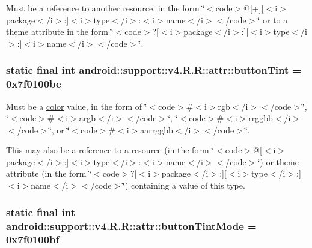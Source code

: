 Must be a reference to another resource, in the form \char`\"{}$<$code$>$@\mbox{[}+\mbox{]}\mbox{[}$<$i$>$package$<$/i$>$:\mbox{]}$<$i$>$type$<$/i$>$:$<$i$>$name$<$/i$>$$<$/code$>$\char`\"{} or to a theme attribute in the form \char`\"{}$<$code$>$?\mbox{[}$<$i$>$package$<$/i$>$:\mbox{]}\mbox{[}$<$i$>$type$<$/i$>$:\mbox{]}$<$i$>$name$<$/i$>$$<$/code$>$\char`\"{}. \hypertarget{classandroid_1_1support_1_1v4_1_1_r_1_1attr_52c5252b61da74bac638e9f63458fc16}{
\subsubsection[{buttonTint}]{\setlength{\rightskip}{0pt plus 5cm}static final int android::support::v4.R.R::attr::buttonTint = 0x7f0100be}}
\label{classandroid_1_1support_1_1v4_1_1_r_1_1attr_52c5252b61da74bac638e9f63458fc16}


Must be a \hyperlink{classandroid_1_1support_1_1v4_1_1_r_1_1color}{color} value, in the form of \char`\"{}$<$code$>$\#$<$i$>$rgb$<$/i$>$$<$/code$>$\char`\"{}, \char`\"{}$<$code$>$\#$<$i$>$argb$<$/i$>$$<$/code$>$\char`\"{}, \char`\"{}$<$code$>$\#$<$i$>$rrggbb$<$/i$>$$<$/code$>$\char`\"{}, or \char`\"{}$<$code$>$\#$<$i$>$aarrggbb$<$/i$>$$<$/code$>$\char`\"{}. 

This may also be a reference to a resource (in the form \char`\"{}$<$code$>$@\mbox{[}$<$i$>$package$<$/i$>$:\mbox{]}$<$i$>$type$<$/i$>$:$<$i$>$name$<$/i$>$$<$/code$>$\char`\"{}) or theme attribute (in the form \char`\"{}$<$code$>$?\mbox{[}$<$i$>$package$<$/i$>$:\mbox{]}\mbox{[}$<$i$>$type$<$/i$>$:\mbox{]}$<$i$>$name$<$/i$>$$<$/code$>$\char`\"{}) containing a value of this type. \hypertarget{classandroid_1_1support_1_1v4_1_1_r_1_1attr_3b69bdbe501c005ba957ea050bf30f56}{
\subsubsection[{buttonTintMode}]{\setlength{\rightskip}{0pt plus 5cm}static final int android::support::v4.R.R::attr::buttonTintMode = 0x7f0100bf}}
\label{classandroid_1_1support_1_1v4_1_1_r_1_1attr_3b69bdbe501c005ba957ea050bf30f56}


